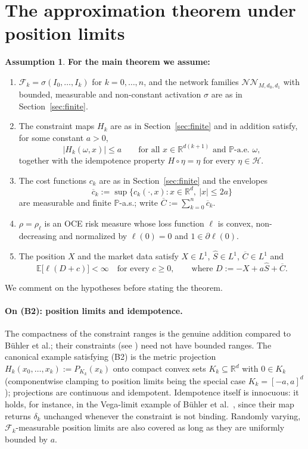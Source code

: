 \documentclass[11pt,a4paper]{report}
\numberwithin{equation}{chapter}
\theoremstyle{plain}
\theoremstyle{definition}
\newtheorem{assumption}[proposition]{Assumption}
\newcommand{\E}{\mathbb{E}}
\newcommand{\PP}{\mathbb{P}}
\newcommand{\R}{\mathbb{R}}
\newcommand{\F}{\mathcal{F}}
\newcommand{\HH}{\mathcal{H}}
\newcommand{\NNet}{\mathcal{N\!N}}
\begin{document}
\section{The approximation theorem under position limits}\label{sec:main}

\begin{assumption}\label{ass:B}
    \textbf{For the main theorem we assume:}
    \begin{enumerate}[leftmargin=*,label=\textup{(B\arabic*)}]
        \item $\F_k=\sigma(I_0,\dots,I_k)$ for $k=0,\dots,n$, and the network families $\NNet_{M,d_0,d_1}$ with bounded, measurable and non-constant activation $\sigma$ are as in Section~\ref{sec:finite}.
        \item The constraint maps $H_k$ are as in Section~\ref{sec:finite} and in addition satisfy, for some constant $a>0$,
              \[
                  |H_k(\omega,x)|\le a\qquad\text{for all }x\in\R^{d(k+1)}\text{ and }\PP\text{-a.e. }\omega,
              \]
              together with the idempotence property $H\circ\eta=\eta$ for every $\eta\in\HH$.
        \item The cost functions $c_k$ are as in Section~\ref{sec:finite} and the envelopes
              \[
                  \overline c_k:=\sup\{c_k(\cdot,x):x\in\R^d,\ |x|\le2a\}
              \]
              are measurable and finite $\PP$-a.s.; write $\overline C:=\sum_{k=0}^n\overline c_k$.
        \item $\rho=\rho_\ell$ is an OCE risk measure whose loss function $\ell$ is convex, non-decreasing and normalized by $\ell(0)=0$ and $1\in\partial\ell(0)$.
        \item The position $X$ and the market data satisfy $X\in L^1$, $\widehat S\in L^1$, $\overline C\in L^1$ and
              \[
                  \E\bigl[\ell(D+c)\bigr]<\infty\quad\text{for every }c\ge0,
                  \qquad\text{where }D:=-X+a\widehat S+\overline C.
              \]
    \end{enumerate}
\end{assumption}

We comment on the hypotheses before stating the theorem.

\paragraph{On (B2): position limits and idempotence.}
The compactness of the constraint ranges is the genuine addition compared to B\"uhler et al.; their constraints (see \cite[Section~2.2]{buehler}) need not have bounded ranges. The canonical example satisfying (B2) is the metric projection $H_k(x_0,\dots,x_k):=P_{K_k}(x_k)$ onto compact convex sets $K_k\subseteq\R^d$ with $0\in K_k$ (componentwise clamping to position limits being the special case $K_k=[-a,a]^d$); projections are continuous and idempotent. Idempotence itself is innocuous: it holds, for instance, in the Vega-limit example of B\"uhler et al.\ \cite[Example~1]{buehler}, since their map returns $\delta_k$ unchanged whenever the constraint is not binding. Randomly varying, $\F_k$-measurable position limits are also covered as long as they are uniformly bounded by $a$.
\end{document}
